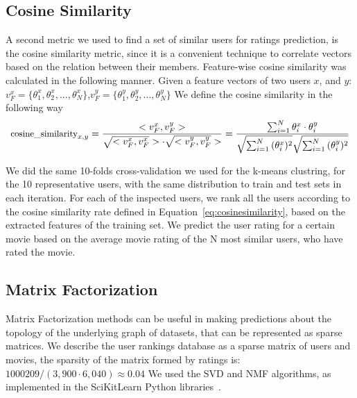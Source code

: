 \subsection{Cosine Similarity}

A second metric we used to find a set of similar users for ratings prediction, is the cosine similarity metric, since it is a convenient technique to correlate vectors based on the relation between their members.
Feature-wise cosine similarity was calculated in the following manner. Given a feature vectors of two users $x$, and $y$: $v^x_{F}=\{\theta^x_{1},\theta^x_{2},...,\theta^x_{N}\}$,$v^y_{F}=\{\theta^y_{1},\theta^y_{2},...,\theta^y_{N}\}$
We define the cosine similarity in the following way
\begin{equation}
\footnotesize
\text{cosine\_similarity}_{x,y} = \frac{<v^x_{F},v^y_{F}>}{\sqrt{<v^x_{F},v^x_{F}}> \cdot \sqrt{<v^y_{F},v^y_{F}}>}=\frac{\sum^N_{i=1}{\theta^x_i \cdot \theta^y_i}}{{\sqrt{\sum^N_{i=1}{(\theta^x_i)^2} }}\sqrt{\sum^N_{i=1}{(\theta^y_i)^2 }}}
\label{eq:cosinesimilarity}
\end{equation}

We did the same 10-folds cross-validation we used for the k-means clustring, for the 10 representative users, with the same distribution to train and test sets in each iteration. For each of the inspected users, we rank all the users according to the cosine similarity rate defined in Equation~\ref{eq:cosinesimilarity}, based on the extracted features of the training set.
We predict the user rating for a certain movie based on the average movie rating of the N most similar users, who have rated the movie.


\subsection{Matrix Factorization}

Matrix Factorization methods can be useful in making predictions about the topology of the underlying graph of datasets, that can be represented as sparse matrices.
We describe the user rankings database as a sparse matrix of users and movies, the sparsity of the matrix formed by ratings is: $1000209/(3,900 \cdot 6,040)\approx0.04$
We used the SVD and NMF algorithms, as implemented in the SciKitLearn Python libraries~\cite{pedregosa2011scikit}.

